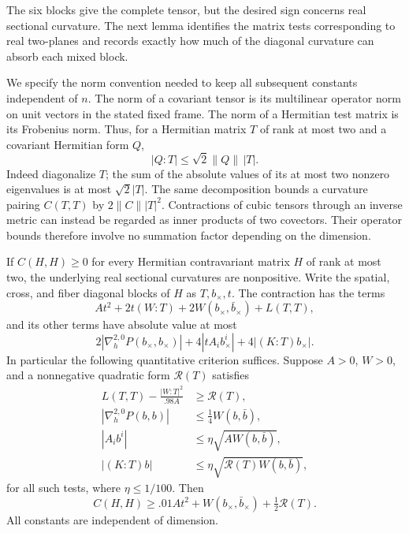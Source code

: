 The six blocks give the complete tensor, but the desired sign concerns
real sectional curvature. The next lemma identifies the matrix tests
corresponding to real two-planes and records exactly how much of the
diagonal curvature can absorb each mixed block.

We specify the norm convention needed to keep all subsequent constants
independent of \(n\).  The norm of a covariant tensor is its
multilinear operator norm on unit vectors in the stated fixed frame.
The norm of a Hermitian test matrix is its Frobenius norm.  Thus, for a
Hermitian matrix \(T\) of rank at most two and a covariant Hermitian form \(Q\),
\begin{equation}\label{fiber:ranknorm}
 |Q:T|\le\sqrt2\|Q\|\,|T|.
\end{equation}
Indeed diagonalize \(T\); the sum of the absolute values of its at most two
nonzero eigenvalues is at most \(\sqrt2|T|\).
The same decomposition bounds a curvature pairing \(C(T,T)\) by
\(2\|C\||T|^2\).  Contractions of cubic tensors through an inverse
metric can instead be regarded as inner products of two covectors.
Their operator bounds therefore involve no summation factor depending
on the dimension.

\begin{lemma}\label{fiber:ranktwo}
If \(C(H,H)\ge0\) for every Hermitian contravariant matrix \(H\) of rank
at most two, the underlying real sectional curvatures are nonpositive.
Write the spatial, cross, and fiber diagonal blocks of \(H\) as
\(T,b_\times,t\).  The contraction has the terms
\begin{equation}\label{fiber:contraction}
 At^2+2t(W:T)+2W(b_\times,\bar b_\times)+L(T,T),
\end{equation}
and its other terms have absolute value at most
\begin{equation}\label{fiber:otherterms}
 2|\nabla_h^{2,0}P(b_\times,b_\times)|
 +4|tA_i b_\times^i|+4|(K:T)b_\times|.
\end{equation}
In particular the following quantitative criterion suffices.  Suppose
\(A>0\), \(W>0\), and a nonnegative quadratic form \(\mathcal R(T)\)
satisfies
\begin{align}
 L(T,T)-\frac{|W:T|^2}{.98A}&\ge\mathcal R(T),
 \label{fiber:reserve}\\
 |\nabla_h^{2,0}P(b,b)|&\le\tfrac14 W(b,\bar b),
 \label{fiber:spinabs}\\
 |A_i b^i|&\le\eta\sqrt{A W(b,\bar b)},
 \label{fiber:Aiabs}\\
 |(K:T)b|&\le\eta\sqrt{\mathcal R(T)W(b,\bar b)},
 \label{fiber:Kabs}
\end{align}
for all such tests, where \(\eta\le1/100\).  Then
\begin{equation}\label{fiber:retained}
 C(H,H)\ge .01At^2+W(b_\times,\bar b_\times)
                         +\tfrac12\mathcal R(T).
\end{equation}
All constants are independent of dimension.
\end{lemma}

